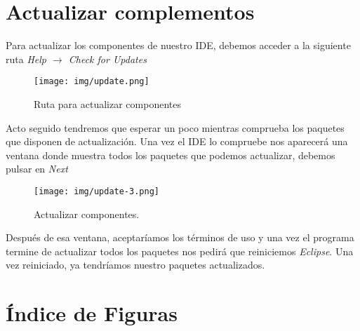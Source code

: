 \documentclass{article}
\begin{document}
    \section{Actualizar complementos}
      Para actualizar los componentes de nuestro IDE, debemos acceder a la siguiente ruta \textit{Help $\rightarrow$ Check for Updates}
      \begin{figure}[h]
        \centering
        \texttt{[image: img/update.png]}
        \caption{Ruta para actualizar componentes}
      \end{figure}
      Acto seguido tendremos que esperar un poco mientras comprueba los paquetes que disponen de actualización. Una vez el IDE lo compruebe nos aparecerá
      una ventana donde muestra todos los paquetes que podemos actualizar, debemos pulsar en \textit{Next}
      \begin{figure}[h]
        \centering
        \texttt{[image: img/update-3.png]}
        \caption{Actualizar componentes.}
      \end{figure}
      Después de esa ventana, aceptaríamos los términos de uso y una vez el programa termine de actualizar todos los paquetes nos pedirá que reiniciemos \textit{Eclipse}.
      Una vez reiniciado, ya tendríamos nuestro paquetes actualizados.
  \newpage
    \section{Índice de Figuras}
    \listoffigures
\end{document}
